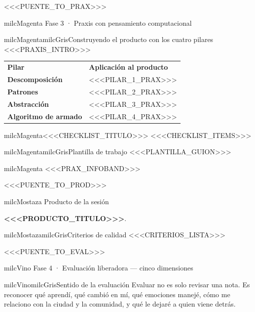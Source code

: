 \documentclass[11pt,letterpaper]{article}
\newcommand{\puente}[1]{%
  \begin{puentebox}%
    \textcolor{milcGradeDark}{\textbf{\textrightarrow}}\hspace{2mm}#1%
  \end{puentebox}%
}
\begin{document}
\puente{<<<PUENTE_TO_PRAX>>>}

\begin{titlebox}{milcMagenta}
Fase 3 · Praxis con pensamiento computacional
\end{titlebox}

\begin{softbox}{milcMagenta}{milcGris}{Construyendo el producto con los cuatro pilares}
<<<PRAXIS_INTRO>>>
\end{softbox}

\small
\begin{tabularx}{\textwidth}{>{\bfseries\RaggedRight\arraybackslash}p{3.6cm}Y}
\color{white}Pilar & \color{white}\bfseries Aplicación al producto\\
Descomposición & <<<PILAR_1_PRAX>>>\\
Patrones & <<<PILAR_2_PRAX>>>\\
Abstracción & <<<PILAR_3_PRAX>>>\\
Algoritmo de armado & <<<PILAR_4_PRAX>>>\\
\end{tabularx}
\normalsize

\begin{drawbox}{milcMagenta}{<<<CHECKLIST_TITULO>>>}
<<<CHECKLIST_ITEMS>>>
\end{drawbox}

\begin{softbox}{milcMagenta}{milcGris}{Plantilla de trabajo}
<<<PLANTILLA_GUION>>>
\end{softbox}

\begin{infoband}{milcMagenta}
<<<PRAX_INFOBAND>>>
\end{infoband}

\puente{<<<PUENTE_TO_PROD>>>}

\begin{titlebox}{milcMostaza}
Producto de la sesión
\end{titlebox}
\textbf{<<<PRODUCTO_TITULO>>>}.
\begin{softbox}{milcMostaza}{milcGris}{Criterios de calidad}
<<<CRITERIOS_LISTA>>>
\end{softbox}

\puente{<<<PUENTE_TO_EVAL>>>}

\begin{titlebox}{milcVino}
Fase 4 · Evaluación liberadora — cinco dimensiones
\end{titlebox}

\begin{softbox}{milcVino}{milcGris}{Sentido de la evaluación}
Evaluar no es solo revisar una nota. Es reconocer qué aprendí, qué cambió en mí, qué emociones manejé, cómo me relaciono con la ciudad y la comunidad, y qué le dejaré a quien viene detrás.
\end{softbox}
\end{document}
